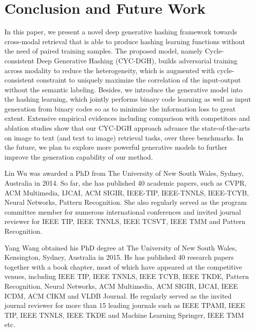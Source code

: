 \documentclass[10pt,journal,twocolumn]{IEEEtran}
\begin{document}
\section{Conclusion and Future Work}\label{sec:con}

In this paper, we present a novel deep generative hashing framework towards cross-modal retrieval that is able to produce hashing learning functions without the need of paired training samples. The proposed model, namely Cycle-consistent Deep Generative Hashing (CYC-DGH), builds adversarial training across modality to reduce the heterogeneity, which is augmented with cycle-consistent constraint to uniquely maximize the correlation of the input-output without the semantic labeling. Besides, we introduce the generative model into the hashing learning, which jointly performs binary code learning as well as input generation from binary codes so as to minimize the information loss to great extent. Extensive empirical evidences including comparison with competitors and ablation studies show that our CYC-DGH approach advance the state-of-the-arts on image to text (and text to image) retrieval tasks, over three benchmarks. In the future, we plan to explore more powerful generative models to further improve the generation capability of our method.


\small


\begin{IEEEbiography}{Lin Wu}
was awarded a PhD from The University of New South Wales, Sydney, Australia in 2014.  So far, she has published 40 academic papers, such as CVPR, ACM Multimedia, IJCAI, ACM SIGIR, IEEE-TIP, IEEE-TNNLS, IEEE-TCYB, Neural Networks, Pattern Recognition.  She also regularly served as the program committee member for numerous international conferences and invited journal reviewer for IEEE TIP, IEEE TNNLS, IEEE TCSVT, IEEE TMM and Pattern Recognition.
\end{IEEEbiography}
%
%
\begin{IEEEbiography}{Yang Wang}
obtained his PhD degree at The University of New South Wales, Kensington, Sydney, Australia in 2015.  He has published 40 research papers together with a book chapter, most of which have appeared at the competitive venues, including IEEE TIP, IEEE TNNLS, IEEE TCYB, IEEE TKDE, Pattern Recognition, Neural Networks, ACM Multimedia, ACM SIGIR, IJCAI, IEEE ICDM, ACM CIKM and VLDB Journal.  He regularly served as the invited journal reviewer for more than 15 leading journals such as IEEE TPAMI, IEEE TIP, IEEE TNNLS, IEEE TKDE and Machine Learning Springer, IEEE TMM etc.
\end{IEEEbiography}
\end{document}
